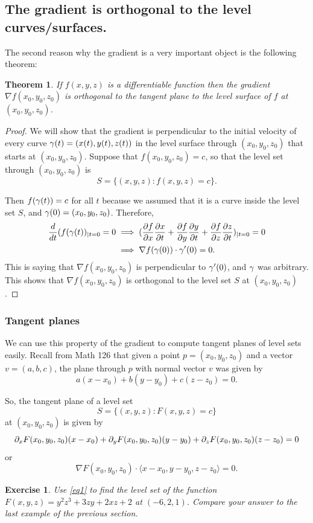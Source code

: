 \documentclass[12pt]{article}
\newtheorem{exercise}{Exercise}
\newtheorem{theorem}{Theorem}
\newcommand{\gen}{(x_0,y_0,z_0)}
\begin{document}
\subsection*{The gradient is orthogonal to the level curves/surfaces.}
The second reason why the gradient is a very important object is the following theorem:
\begin{theorem}
If $f(x,y,z)$ is a differentiable function then the gradient $\nabla f (x_0,y_0,z_0)$ is orthogonal to the tangent plane to the level surface of $f$ at $(x_0,y_0,z_0)$.
\end{theorem}
\begin{proof}
We will show that the gradient is perpendicular to the initial velocity of every curve $\gamma (t)=(x(t),y(t),z(t))$ in the level surface through $(x_0,y_0,z_0)$ that starts at $(x_0,y_0,z_0)$. Suppose that $f(x_0,y_0,z_0)=c$, so that the level set through $( x_0,y_0,z_0)$ is $$S=\{(x,y,z):f(x,y,z)=c\}.$$

Then $f(\gamma(t))=c$ for all $t$ because we assumed that it is a curve inside the level set $S$, and $\gamma(0)=(x_0,y_0,z_0)$. Therefore, \begin{align*}
\frac{d}{dt}(f(\gamma(t))_{|t=0}=0&\implies (\frac{\partial f}{\partial x}\frac{\partial x}{\partial t}+\frac{\partial f}{\partial y}\frac{\partial y}{\partial t}+\frac{\partial f}{\partial z}\frac{\partial z}{\partial t})_{|t=0}=0\\
&\implies \nabla f(\gamma(0))\cdot \gamma'(0)=0.
\end{align*}
This is saying that $\nabla f(x_0,y_0,z_0)$ is perpendicular to $\gamma'(0)$, and $\gamma$ was arbitrary. This shows that $\nabla f(x_0,y_0,z_0)$ is orthogonal to the level set $S$ at $(x_0,y_0,z_0)$.
\end{proof}


\subsubsection*{Tangent planes}
We can use this property of the gradient to compute tangent planes of level sets easily. Recall from Math 126 that given a point $p=(x_0,y_0,z_0)$ and a vector $v=(a,b,c)$, the plane through $p$ with normal vector $v$ was given by $$a(x-x_0)+b(y-y_0)+c(z-z_0)=0.$$

So, the tangent plane of a level set $$S=\{(x,y,z):F(x,y,z)=c\}$$ at $\gen$ is given by $$\partial_xF (x_0,y_0,z_0)(x-x_0)+\partial_yF(x_0,y_0,z_0)(y-y_0)+\partial_z F(x_0,y_0,z_0)(z-z_0)=0$$ or \begin{equation}\label{eq1}\nabla F(x_0,y_0,z_0)\cdot\langle x-x_0,y-y_0,z-z_0\rangle=0.\end{equation}
\begin{exercise} Use \eqref{eq1} to find the level set of the function $F(x,y,z)=y^2z^3+3zy+2xz+2$ at $(-6,2,1)$. Compare your answer to the last example of the previous section.
\end{exercise}
\end{document}
